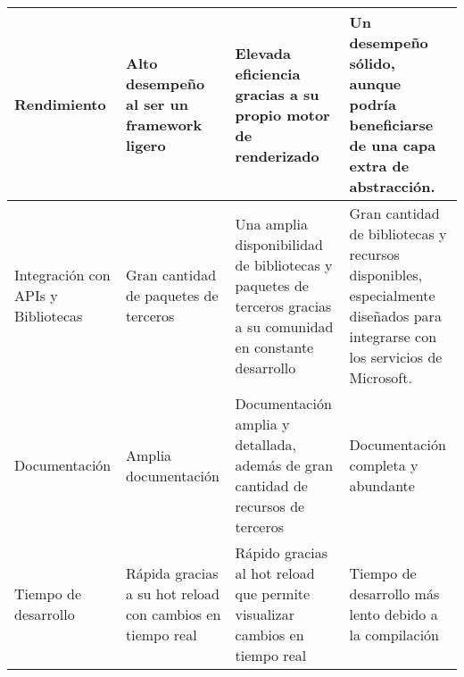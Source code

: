 \begin{longtable}{|p{3cm}|p{3cm}|p{3cm}|p{3cm}|}
    Rendimiento                                    & Alto desempeño al ser un framework ligero                 & Elevada eficiencia gracias a su propio motor de renderizado                                                    & Un desempeño sólido, aunque podría beneficiarse de una capa extra de abstracción.                                            \\\hline
    Integración con APIs y Bibliotecas             & Gran cantidad de paquetes de terceros                     & Una amplia disponibilidad de bibliotecas y paquetes de terceros gracias a su comunidad en constante desarrollo & Gran cantidad de bibliotecas y recursos disponibles, especialmente diseñados para integrarse con los servicios de Microsoft. \\\hline
    Documentación                                  & Amplia documentación                                      & Documentación amplia y detallada, además de gran cantidad de recursos de terceros                              & Documentación completa y abundante                                                                                           \\\hline
    Tiempo de desarrollo                           & Rápida gracias a su hot reload con cambios en tiempo real & Rápido gracias al hot reload que permite visualizar cambios en tiempo real                                     & Tiempo de desarrollo más lento debido a la compilación                                                                       \\
\end{longtable}